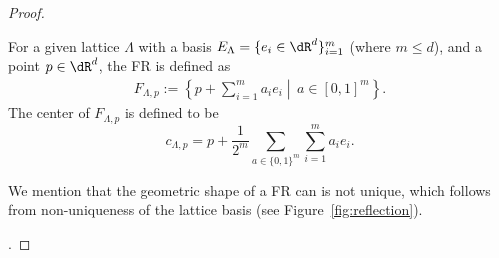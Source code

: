 \begin{proof}

\begin{definition}
    For a given lattice $\Lambda$ with a basis ${E_\Lambda=\{e_i\in \dR^d\}_{i=1}^m}$ (where $m\leq d$), and a point $p\in \dR^d$, the FR is defined as 
    \begin{align*}
        F_{\Lambda,p}:=\left\{p+\sum_{i=1}^m a_i e_i\middle|\,a\in[0,1]^m\right\}. 
    \end{align*}
    The center of $F_{\Lambda,p}$ is defined to be \[c_{\Lambda,p}=p+\frac{1}{2^{m}}\sum_{a\in \{0,1\}^m}\sum_{i=1}^ma_ie_i.\]
\end{definition}
We mention that the geometric shape of a FR can is not unique, which follows from non-uniqueness of the lattice basis (see Figure~\ref{fig:reflection}). 

.




\end{proof}
